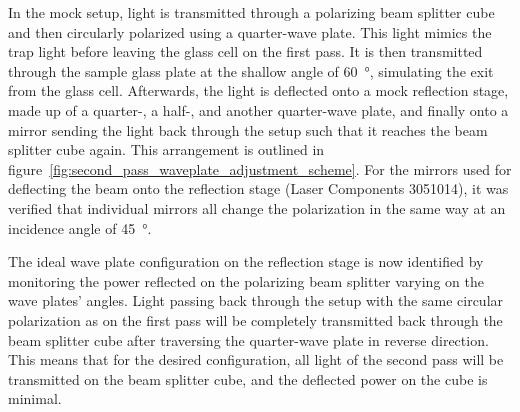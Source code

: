 In the mock setup, light is transmitted through a polarizing beam splitter cube and then circularly polarized using a quarter-wave plate. This light mimics the trap light before leaving the glass cell on the first pass. It is then transmitted through the sample glass plate at the shallow angle of \SI{60}{\degree}, simulating the exit from the glass cell. Afterwards, the light is deflected onto a mock reflection stage, made up of a quarter-, a half-, and another quarter-wave plate, and finally onto a mirror sending the light back through the setup such that it reaches the beam splitter cube again. This arrangement is outlined in figure~\ref{fig:second_pass_waveplate_adjustment_scheme}. For the mirrors used for deflecting the beam onto the reflection stage (Laser Components 3051014), it was verified that individual mirrors all change the polarization in the same way at an incidence angle of \SI{45}{\degree}.

The ideal wave plate configuration on the reflection stage is now identified by monitoring the power reflected on the polarizing beam splitter varying on the wave plates' angles. Light passing back through the setup with the same circular polarization as on the first pass will be completely transmitted back through the beam splitter cube after traversing the quarter-wave plate in reverse direction. This means that for the desired configuration, all light of the second pass will be transmitted on the beam splitter cube, and the deflected power on the cube is minimal.

